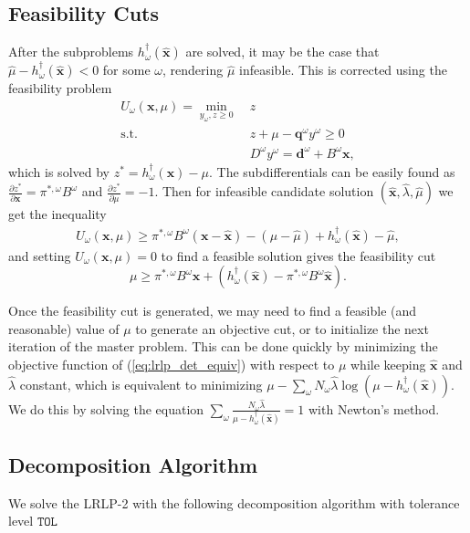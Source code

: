 \documentclass[11pt]{article}
\newcommand{\x}{\mathbf{x}}
\newcommand{\xh}{\hat{\x}}
\newcommand{\lh}{\hat{\lambda}}
\newcommand{\mh}{\hat{\mu}}
\newcommand{\q}{\mathbf{q}}
\renewcommand{\d}{\mathbf{d}}
\newcommand{\st}{\mbox{s.t.}}
\begin{document}
\subsection{Feasibility Cuts}
After the subproblems $h^\dagger_\omega(\xh)$ are solved, it may be the case that $\mh - h^\dagger_\omega(\xh) < 0$ for some $\omega$, rendering $\mh$ infeasible.
This is corrected using the feasibility problem
\begin{align*}
	U_\omega(\x,\mu) = \min_{y_\omega,z \geq 0} \ & z \\
	\st \ & z + \mu - \q^\omega y^\omega \geq 0 \\
	& D^\omega y^\omega = \d^\omega + B^\omega \x,
\end{align*}
which is solved by $z^* = h^\dagger_\omega(\x) - \mu$.
The subdifferentials can be easily found as $\frac{\partial z^*}{\partial \x} = \pi^{*,\omega} B^\omega$ and $\frac{\partial z^*}{\partial \mu} = -1$.
Then for infeasible candidate solution $(\xh,\lh,\mh)$ we get the inequality
\begin{align*}
	U_\omega(\x,\mu) \geq \pi^{*,\omega}B^\omega(\x-\xh) - (\mu -\mh) + h^\dagger_\omega(\xh) - \mh,
\end{align*}
and setting $U_\omega(\x,\mu) = 0$ to find a feasible solution gives the feasibility cut
\[
	\mu \geq \pi^{*,\omega}B^\omega \x + (h^\dagger_\omega(\xh) - \pi^{*,\omega}B^\omega\xh).
\]

Once the feasibility cut is generated, we may need to find a feasible (and reasonable) value of $\mu$ to generate an objective cut, or to initialize the next iteration of the master problem.
This can be done quickly by minimizing the objective function of (\ref{eq:lrlp_det_equiv}) with respect to $\mu$ while keeping $\xh$ and $\lh$ constant, which is equivalent to minimizing $\mu - \sum_\omega N_\omega \lh \log(\mu - h^\dagger_\omega(\xh))$.
We do this by solving the equation $\sum_\omega \frac{N_\omega \lh}{\mu - h^\dagger_\omega(\xh)} = 1$ with Newton's method.

\subsection{Decomposition Algorithm}

We solve the LRLP-2 with the following decomposition algorithm with tolerance level $\texttt{TOL}$
\end{document}
